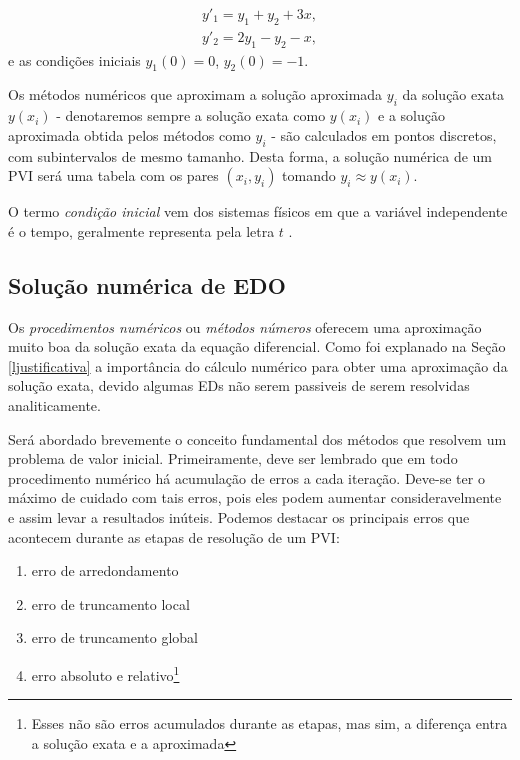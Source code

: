 \begin{equation*}
\begin{split}
y'_{1} = y_{1} + y_{2} + 3x, \\
y'_{2} = 2y_{1} - y_{2} -x,
\end{split}
\end{equation*}
e as condições iniciais $y_{1}(0) = 0$, $y_{2}(0) = -1$.

Os métodos numéricos que aproximam a solução aproximada $y_{i}$ da solução exata $y(x_{i})$ - 
denotaremos sempre a solução exata como $y(x_{i})$ e a solução aproximada obtida pelos 
métodos como  $y_{i}$ - são calculados em pontos discretos, com subintervalos de mesmo tamanho.
Desta forma, a solução numérica de um PVI será uma tabela com os pares $(x_{i},y_{i})$
tomando $y_{i} \approx y(x_{i})$.

O termo \emph{condição inicial} vem dos sistemas físicos em que a variável independente
é o tempo, geralmente representa pela letra $t$ \cite{zill2003equacoes}.

\subsection{Solução numérica de EDO}
Os \emph{procedimentos numéricos} ou \emph{métodos números} oferecem uma aproximação muito
boa da solução exata da equação diferencial. Como foi explanado na Seção
\ref{ljustificativa} a importância do cálculo numérico para obter uma aproximação
da solução exata, devido algumas EDs não serem passiveis de serem resolvidas analiticamente.

Será abordado brevemente o conceito fundamental dos métodos que resolvem um 
problema de valor inicial. Primeiramente, deve ser lembrado que em todo 
procedimento numérico há acumulação de erros a cada iteração. Deve-se ter o máximo
de cuidado com tais erros, pois eles podem aumentar consideravelmente
e assim levar a resultados inúteis. Podemos destacar os principais erros  
que acontecem durante as etapas de resolução de um PVI:
\begin{enumerate}[label=\roman*.]
\item erro de arredondamento
\item erro de truncamento local
\item erro de truncamento global
\item erro absoluto e relativo\footnote{Esses não são erros acumulados durante
as etapas, mas sim, a diferença entra a solução exata e a aproximada}
\end{enumerate}

